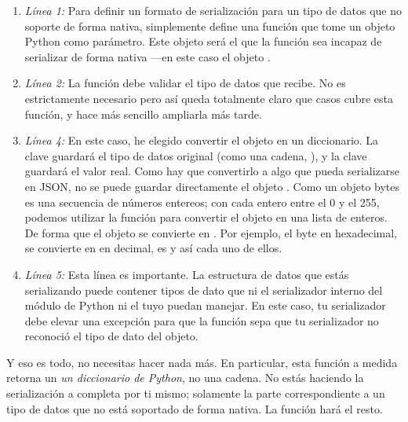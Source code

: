 \begin{enumerate}

\item \emph{Línea 1:} Para definir un formato de serialización para un tipo de datos que  no soporte de forma nativa, simplemente define una función que tome un objeto Python como parámetro. Este objeto será el que la función  sea incapaz de serializar de forma nativa ---en este caso el objeto .

\item \emph{Línea 2:} La función debe validar el tipo de datos que recibe. No es estrictamente necesario pero así queda totalmente claro que casos cubre esta función, y hace más sencillo ampliarla más tarde.

\item \emph{Línea 4:} En este caso, he elegido convertir el objeto  en un diccionario. La clave  guardará el tipo de datos original (como una cadena, ), y la clave  guardará el valor real. Como hay que convertirlo a algo que pueda serializarse en JSON, no se puede guardar directamente el objeto . Como un objeto bytes es una secuencia de números entereos; con cada entero entre el 0 y el 255, podemos utilizar la función  para convertir el objeto  en una lista de enteros. De forma que el objeto  se convierte en \codigo{[222, 213, 180, 248]}. Por ejemplo, el byte \codigo{\\xDE} en hexadecimal, se convierte en  en decimal,  es  y así cada uno de ellos.

\item \emph{Línea 5:} Esta línea es importante. La estructura de datos que estás serializando puede contener tipos de dato que ni el serializador interno del módulo de Python ni el tuyo puedan manejar. En este caso, tu serializador debe elevar una excepción  para que la función  sepa que tu serializador no reconoció el tipo de dato del objeto.

\end{enumerate}

Y eso es todo, no necesitas hacer nada más. En particular, esta función a medida retorna un \emph{un diccionario de Python}, no una cadena. No estás haciendo la serialización a  completa por ti mismo; solamente la parte correspondiente a un tipo de datos que no está soportado de forma nativa. La función  hará el resto.

